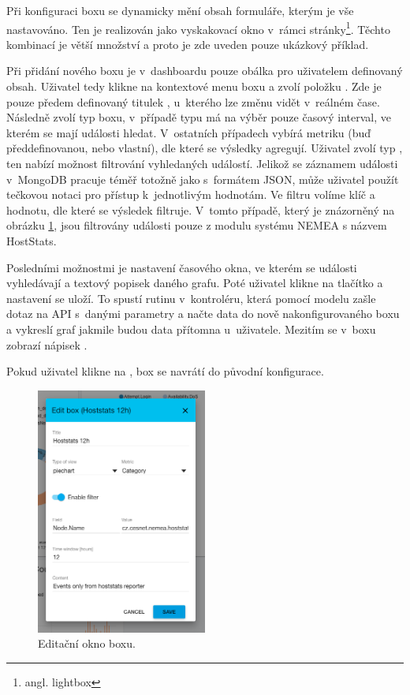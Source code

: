 Při konfiguraci boxu se dynamicky mění obsah formuláře, kterým je vše nastavováno. Ten je realizován jako vyskakovací okno v~rámci stránky\footnote{angl. lightbox}. Těchto kombinací je větší množství a proto je zde uveden pouze ukázkový příklad.

Při přidání nového boxu je v~dashboardu pouze obálka pro uživatelem definovaný obsah. Uživatel tedy klikne na kontextové menu boxu a zvolí položku . Zde je pouze předem definovaný titulek , u~kterého lze změnu vidět v~reálném čase. Následně zvolí typ boxu, v~případě typu  má na výběr pouze časový interval, ve kterém se mají události hledat. V~ostatních případech vybírá metriku (buď předdefinovanou, nebo vlastní), dle které se výsledky agregují. Uživatel zvolí typ , ten nabízí možnost filtrování vyhledaných událostí. Jelikož se záznamem události v~MongoDB pracuje téměř totožně jako s~formátem JSON, může uživatel použít tečkovou notaci pro přístup k~jednotlivým hodnotám. Ve filtru volíme klíč a hodnotu, dle které se výsledek filtruje. V~tomto případě, který je znázorněný na obrázku \ref{fig:box_edit}, jsou filtrovány události pouze z modulu systému NEMEA s názvem HostStats.

Posledními možnostmi je nastavení časového okna, ve kterém se události vyhledávají a textový popisek daného grafu. Poté uživatel klikne na tlačítko  a nastavení se uloží. To spustí rutinu v~kontroléru, která pomocí modelu zašle dotaz na API s~danými parametry a načte data do nově nakonfigurovaného boxu a vykreslí graf jakmile budou data přítomna u~uživatele. Mezitím se v~boxu zobrazí nápisek .

Pokud uživatel klikne na , box se navrátí do původní konfigurace.

\begin{figure}[ht]
    \centering
    \includegraphics[width=0.5\textwidth]{fig/box_edit.png}
    \caption{Editační okno boxu.} \label{fig:box_edit}
\end{figure}

